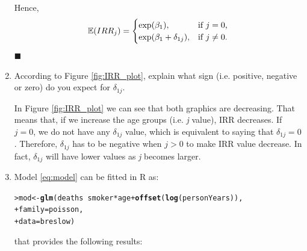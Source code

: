 \documentclass[10pt,a4paper,twoside]{article}\usepackage[]{graphicx}\usepackage[]{xcolor}
\makeatletter
\newcommand{\hlopt}[1]{\textcolor[rgb]{0,0,0}{#1}}%
\newcommand{\hlstd}[1]{\textcolor[rgb]{0.345,0.345,0.345}{#1}}%
\newcommand{\hlkwb}[1]{\textcolor[rgb]{0.69,0.353,0.396}{#1}}%
\newcommand{\hlkwc}[1]{\textcolor[rgb]{0.333,0.667,0.333}{#1}}%
\newcommand{\hlkwd}[1]{\textcolor[rgb]{0.737,0.353,0.396}{\textbf{#1}}}%
\newenvironment{kframe}{%
 \def\at@end@of@kframe{}%
 \ifinner\ifhmode%
  \def\at@end@of@kframe{\end{minipage}}%
  \begin{minipage}{\columnwidth}%
 \fi\fi%
 \def\FrameCommand##1{\hskip\@totalleftmargin \hskip-\fboxsep
 \colorbox{shadecolor}{##1}\hskip-\fboxsep
     \hskip-\linewidth \hskip-\@totalleftmargin \hskip\columnwidth}%
 \MakeFramed {\advance\hsize-\width
   \@totalleftmargin\z@ \linewidth\hsize
   \@setminipage}}%
 {\par\unskip\endMakeFramed%
 \at@end@of@kframe}
\newenvironment{knitrout}{}{} %
\newcommand*{\QEDB}{\null\nobreak\hfill\ensuremath{\blacksquare}}
\makeatother
\begin{document}
\begin{enumerate}
Hence, 
\begin{equation}
        \mathbb{E}(IRR_{j}) = \begin{cases} \text{exp}(\beta_{1}), & \mbox{if $j = 0$,} \\ \text{exp}(\beta_{1} + \delta_{1j}), & \mbox{if $j \not= 0$.} \end{cases}\\
\end{equation}
\QEDB
\item According to Figure \ref{fig:IRR_plot}, explain what sign (i.e. positive, negative or zero) do you
expect for $\delta_{1j}$.

In Figure \ref{fig:IRR_plot} we can see that both graphics are decreasing. That means that, if we increase the age groups (i.e. \textit{j} value), IRR decreases. If $j = 0$, we do not have any $\delta_{1j}$ value, which is equivalent to saying that $\delta_{1j} = 0$. Therefore, $\delta_{1j}$ has to be negative when $j > 0$ to make IRR value decrease. In fact, $\delta_{1j}$ will have lower values as \textit{j} becomes larger.

\item Model \eqref{eq:model} can be fitted in \textsf{R} as:
\begin{knitrout}\footnotesize
{}\color{fgcolor}\begin{kframe}
\begin{alltt}
\hlstd{> }\hlstd{mod} \hlkwb{<-} \hlkwd{glm}\hlstd{(deaths} \hlopt{~} \hlstd{smoker} \hlopt{*} \hlstd{age} \hlopt{+} \hlkwd{offset}\hlstd{(}\hlkwd{log}\hlstd{(personYears)),}
\hlstd{+ }           \hlkwc{family} \hlstd{= poisson,}
\hlstd{+ }           \hlkwc{data} \hlstd{= breslow)}
\end{alltt}
\end{kframe}
\end{knitrout}

that provides the following results:


\end{enumerate}
\end{document}
